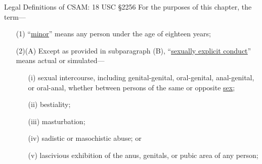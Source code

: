 \documentclass[nobackground,dvipsnames,table,aspectratio=169]{beamer}
\begin{document}
\begin{frame}{Legal Definitions of CSAM: 18 USC §2256}
    For the purposes of this chapter, the term—
    \begin{enumerate}
        \item[(1)] “\underline{\href{https://www.law.cornell.edu/definitions/uscode.php?width=840&height=800&iframe=true&def_id=18-USC-103901109-1416780791&term_occur=999&term_src=title:18:part:I:chapter:110:section:2256}{minor}}” means any person under the age of eighteen years;
        \item[(2)(A)] Except as provided in subparagraph (B), “\underline{\href{https://www.law.cornell.edu/definitions/uscode.php?width=840&height=800&iframe=true&def_id=18-USC-821371409-1416780790&term_occur=999&term_src=}{sexually explicit conduct}}” means actual or simulated—
        \begin{enumerate}
            \item[(i)] sexual intercourse, including genital-genital, oral-genital, anal-genital, or oral-anal, whether between persons of the same or opposite \underline{\href{https://www.law.cornell.edu/definitions/uscode.php?width=840&height=800&iframe=true&def_id=18-USC-113766-970642657&term_occur=999&term_src=}{sex}};
            \item[(ii)]bestiality;
            \item[(iii)]masturbation;
            \item[(iv)]sadistic or masochistic abuse; or
            \item[(v)]lascivious exhibition of the anus, genitals, or pubic area of any person;
        \end{enumerate}
    \end{enumerate}
\end{frame}
\end{document}

